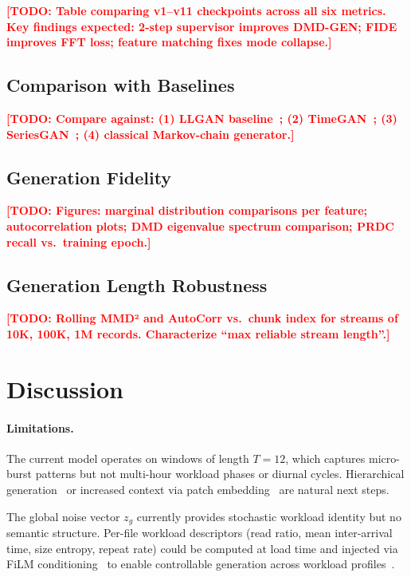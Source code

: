 \documentclass[10pt,twocolumn]{article}
\newcommand{\todo}[1]{\textcolor{red}{\textbf{[TODO: #1]}}}
\begin{document}
\todo{Table comparing v1--v11 checkpoints across all six metrics.
Key findings expected: 2-step supervisor improves DMD-GEN;
FIDE improves FFT loss; feature matching fixes mode collapse.}

\subsection{Comparison with Baselines}

\todo{Compare against: (1) LLGAN baseline~\cite{zhang2024llgan};
(2) TimeGAN~\cite{yoon2019timegan}; (3) SeriesGAN~\cite{seriesgan2024};
(4) classical Markov-chain generator.}

\subsection{Generation Fidelity}

\todo{Figures: marginal distribution comparisons per feature;
autocorrelation plots; DMD eigenvalue spectrum comparison;
PRDC recall vs.\ training epoch.}

\subsection{Generation Length Robustness}

\todo{Rolling MMD² and AutoCorr vs.\ chunk index for streams
of 10K, 100K, 1M records.  Characterize ``max reliable stream length''.}


\section{Discussion}
\label{sec:discussion}

\paragraph{Limitations.}
The current model operates on windows of length $T = 12$, which
captures micro-burst patterns but not multi-hour workload phases or
diurnal cycles.  Hierarchical generation~\cite{stagediff2025} or
increased context via patch embedding~\cite{ttsgan2022} are natural
next steps.

The global noise vector $z_g$ currently provides stochastic workload
identity but no semantic structure.  Per-file workload
descriptors (read ratio, mean inter-arrival time, size entropy, repeat
rate) could be computed at load time and injected via FiLM
conditioning~\cite{perez2018film} to enable controllable generation
across workload profiles~\cite{constrainedts2023}.
\end{document}
